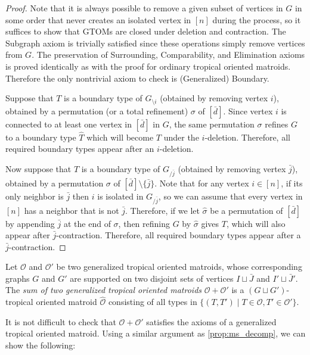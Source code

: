 \documentclass[letterpaper,reqno,11pt]{amsart}
\begin{document}
\begin{proof}
    Note that it is always possible to remove a given subset of vertices in $G$ in some order that never creates an isolated vertex in $[n]$ during the process, so it suffices to show that GTOMs are closed under deletion and contraction. The Subgraph axiom is trivially satisfied since these operations simply remove vertices from $G$. The preservation of Surrounding, Comparability, and Elimination axioms is proved identically as with the proof for ordinary tropical oriented matroids. Therefore the only nontrivial axiom to check is (Generalized) Boundary.

    Suppose that $T$ is a boundary type of $G_{\setminus i}$ (obtained by removing vertex $i$), obtained by a permutation (or a total refinement) $\sigma$ of $[\bar{d}]$. Since vertex $i$ is connected to at least one vertex in $[\bar{d}]$ in $G$, the same permutation $\sigma$ refines $G$ to a boundary type $\hat{T}$ which will become $T$ under the $i$-deletion. Therefore, all required boundary types appear after an $i$-deletion.

    Now suppose that $T$ is a boundary type of $G_{/\bar{j}}$ (obtained by removing vertex $\bar{j}$), obtained by a permutation $\sigma$ of $[\bar{d}]\setminus \{\bar{j}\}$. Note that for any vertex $i\in [n]$, if its only neighbor is $\bar{j}$ then $i$ is isolated in $G_{/\bar{j}}$, so we can assume that every vertex in $[n]$ has a neighbor that is not $\bar{j}$. Therefore, if we let $\hat{\sigma}$ be a permutation of $[\bar{d}]$ by appending $\bar{j}$ at the end of $\sigma$, then refining $G$ by $\hat{\sigma}$ gives $T$, which will also appear after $\bar{j}$-contraction. Therefore, all required boundary types appear after a $\bar{j}$-contraction.
\end{proof}

\begin{definition}\label{def:gtom_sum}
    Let $\mathcal{O}$ and $\mathcal{O}'$ be two generalized tropical oriented matroids, whose corresponding graphs $G$ and $G'$ are supported on two disjoint sets of vertices $I\sqcup \bar{J}$ and $I'\sqcup \bar{J}'$. The \emph{sum of two generalized tropical oriented matroids} $\mathcal{O} + \mathcal{O}'$ is a $(G\sqcup G')$-tropical oriented matroid $\hat{\mathcal{O}}$ consisting of all types in $\{(T, T')\mid T\in \mathcal{O}, T'\in \mathcal{O}'\}$.
\end{definition}

It is not difficult to check that $\mathcal{O} + \mathcal{O}'$ satisfies the axioms of a generalized tropical oriented matroid. Using a similar argument as \cref{prop:ms_decomp}, we can show the following:
\end{document}
